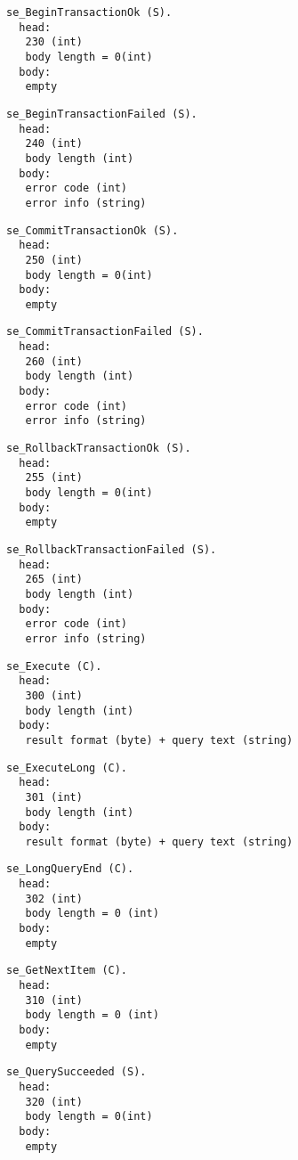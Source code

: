 \documentclass[a4paper,12pt]{article}
\begin{document}
\begin{verbatim}
se_BeginTransactionOk (S).
  head:
   230 (int)
   body length = 0(int)
  body:
   empty
\end{verbatim}
   
\begin{verbatim}
se_BeginTransactionFailed (S).
  head:
   240 (int)
   body length (int)
  body:
   error code (int)
   error info (string)
\end{verbatim}

\begin{verbatim}
se_CommitTransactionOk (S).
  head:
   250 (int)
   body length = 0(int)
  body:
   empty
\end{verbatim}

\begin{verbatim}
se_CommitTransactionFailed (S).
  head:
   260 (int)
   body length (int)
  body:
   error code (int)
   error info (string)
\end{verbatim}

\begin{verbatim}
se_RollbackTransactionOk (S).
  head:
   255 (int)
   body length = 0(int)
  body:
   empty
\end{verbatim}

\begin{verbatim}
se_RollbackTransactionFailed (S).
  head:
   265 (int)
   body length (int)
  body:
   error code (int)
   error info (string)
\end{verbatim}

\begin{verbatim}
se_Execute (C).
  head:
   300 (int)
   body length (int)
  body:
   result format (byte) + query text (string)
\end{verbatim}

\begin{verbatim}
se_ExecuteLong (C).
  head:
   301 (int)
   body length (int)
  body:
   result format (byte) + query text (string)
\end{verbatim}

\begin{verbatim}
se_LongQueryEnd (C).
  head:
   302 (int)
   body length = 0 (int)
  body:
   empty
\end{verbatim}

\begin{verbatim}
se_GetNextItem (C).
  head:
   310 (int)
   body length = 0 (int)
  body:
   empty
\end{verbatim}

\begin{verbatim}
se_QuerySucceeded (S).
  head:
   320 (int)
   body length = 0(int)
  body:
   empty
\end{verbatim}
\end{document}
